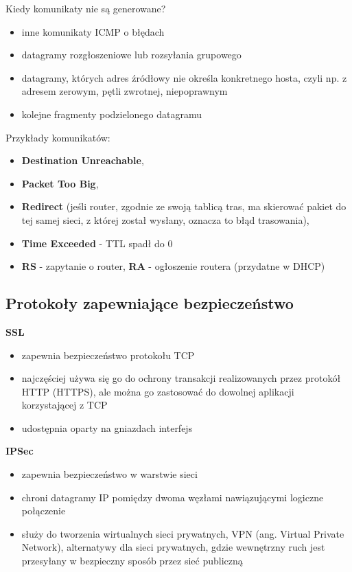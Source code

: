 Kiedy komunikaty nie są generowane? 
\begin{itemize}
    \item inne komunikaty ICMP o błędach
    \item datagramy rozgłoszeniowe lub rozsyłania grupowego
    \item datagramy, których adres źródłowy nie określa konkretnego hosta, czyli np. z adresem zerowym, pętli zwrotnej, niepoprawnym
    \item kolejne fragmenty podzielonego datagramu
\end{itemize}

Przykłady komunikatów: 
\begin{itemize}
    \item \textbf{Destination Unreachable},
    \item \textbf{Packet Too Big},
    \item \textbf{Redirect} (jeśli router, zgodnie ze swoją tablicą tras, ma skierować pakiet do tej samej sieci, z której został wysłany, oznacza to błąd trasowania),
    \item \textbf{Time Exceeded} - TTL spadł do 0
    \item \textbf{RS} - zapytanie o router, \textbf{RA} - ogłoszenie routera (przydatne w DHCP)
\end{itemize}

\subsection{Protokoły zapewniające bezpieczeństwo}

\textbf{SSL}

\begin{itemize}
    \item zapewnia bezpieczeństwo protokołu TCP
    \item najczęściej używa się go do ochrony transakcji realizowanych przez protokół HTTP (HTTPS), ale można go zastosować do dowolnej aplikacji korzystającej z TCP
    \item udostępnia oparty na gniazdach interfejs
\end{itemize}

\textbf{IPSec}

\begin{itemize}
    \item zapewnia bezpieczeństwo w warstwie sieci
    \item chroni datagramy IP pomiędzy dwoma węzłami nawiązującymi logiczne połączenie
    \item służy do tworzenia wirtualnych sieci prywatnych, VPN (ang. Virtual Private Network), alternatywy dla sieci prywatnych, gdzie wewnętrzny ruch jest przesyłany w bezpieczny sposób przez sieć publiczną
\end{itemize}


